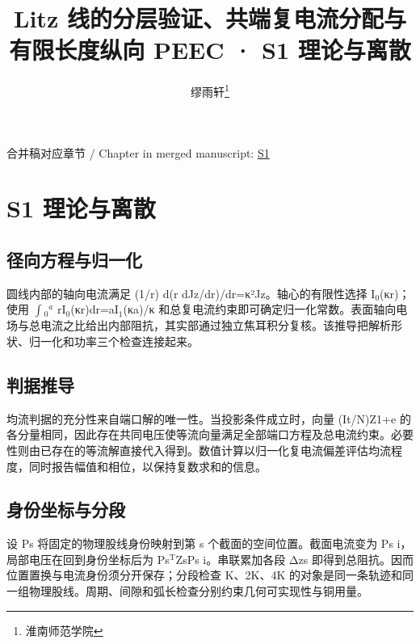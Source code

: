 \documentclass[journal,10pt]{IEEEtran}
\begin{document}
\title{Litz 线的分层验证、共端复电流分配与有限长度纵向 PEEC · S1 理论与离散}
\author{缪雨轩\thanks{淮南师范学院}}

\maketitle
\noindent 合并稿对应章节 / Chapter in merged manuscript: \href{paper_zh-CN_ieee.pdf#chapter-S1}{S1}\par
\FloatBarrier
\section*{S1 理论与离散}
\hypertarget{chapter-S1}{}
\subsection*{径向方程与归一化}
\hypertarget{S1.round_derivation.heading}{}
圆线内部的轴向电流满足 (1/r) d(r dJz/dr)/dr=κ²Jz。轴心的有限性选择 I\(_0\)(κr)；使用 \(\int\)\(_0\)\(^a\) rI\(_0\)(κr)dr=aI\(_1\)(κa)/κ 和总复电流约束即可确定归一化常数。表面轴向电场与总电流之比给出内部阻抗，其实部通过独立焦耳积分复核。该推导把解析形状、归一化和功率三个检查连接起来。


\subsection*{判据推导}
\hypertarget{S1.sharing_derivation.heading}{}
均流判据的充分性来自端口解的唯一性。当投影条件成立时，向量 (It/N)Z1+e 的各分量相同，因此存在共同电压使等流向量满足全部端口方程及总电流约束。必要性则由已存在的等流解直接代入得到。数值计算以归一化复电流偏差评估均流程度，同时报告幅值和相位，以保持复数求和的信息。


\subsection*{身份坐标与分段}
\hypertarget{S1.dtm_derivation.heading}{}
设 Ps 将固定的物理股线身份映射到第 s 个截面的空间位置。截面电流变为 Ps i，局部电压在回到身份坐标后为 Ps\(^{\mathrm T}\)ZsPs i。串联累加各段 Δzs 即得到总阻抗。因而位置置换与电流身份须分开保存；分段检查 K、2K、4K 的对象是同一条轨迹和同一组物理股线。周期、间隙和弧长检查分别约束几何可实现性与铜用量。
\end{document}
